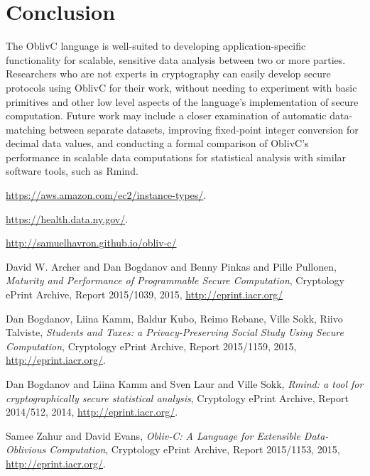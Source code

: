 \documentclass[conference]{IEEEtran}
\begin{document}
\section{Conclusion}
The OblivC language is well-suited to developing application-specific functionality for scalable, sensitive data analysis between two or more parties.
Researchers who are not experts in cryptography can easily develop secure protocols
using OblivC for their work, without needing to experiment with basic primitives
and other low level aspects of the language's implementation of secure computation.
Future work may include a closer examination of automatic data-matching between
separate datasets, improving fixed-point integer conversion for decimal data values,
and conducting a formal comparison of OblivC's performance in scalable
data computations for statistical analysis with similar software tools,
such as Rmind\cite{eprint:BKLS14}.


\begin{thebibliography}{1}

  \url{https://aws.amazon.com/ec2/instance-types/}.

  \url{https://health.data.ny.gov/}.

  \url{http://samuelhavron.github.io/obliv-c/}

    David W. Archer and Dan Bogdanov and Benny Pinkas and Pille Pullonen,
    \emph{Maturity and Performance of Programmable Secure Computation},
    Cryptology ePrint Archive, Report 2015/1039,
    2015,
    \url{http://eprint.iacr.org/}

    Dan Bogdanov, Liina Kamm, Baldur Kubo, Reimo Rebane, Ville Sokk, Riivo Talviste,
    \emph{Students and Taxes: a Privacy-Preserving Social Study Using Secure Computation},
    Cryptology ePrint Archive, Report 2015/1159,
    2015,
    \url{http://eprint.iacr.org/}.

    Dan Bogdanov and Liina Kamm and Sven Laur and Ville Sokk,
    \emph{Rmind: a tool for cryptographically secure statistical analysis},
    Cryptology ePrint Archive, Report 2014/512,
    2014,
    \url{http://eprint.iacr.org/}.

  Samee Zahur and David Evans, \emph{Obliv-C: A Language for Extensible 
  Data-Oblivious Computation}, Cryptology ePrint Archive, 
  Report 2015/1153, 2015, 
  \url{http://eprint.iacr.org/}.

\end{thebibliography}
\end{document}
